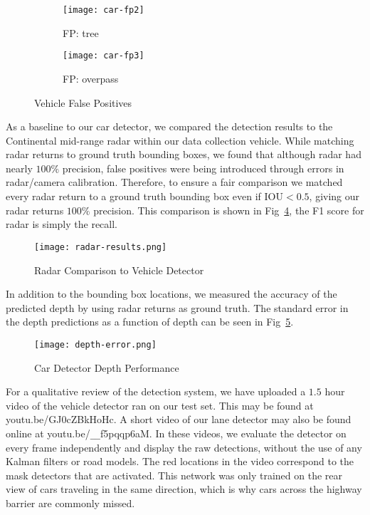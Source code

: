 \documentclass[journal]{IEEEtran}
\begin{document}
\begin{figure}[tb]
        \centering
        \begin{subfigure}[b]{1.7in}\texttt{[image: car-fp2]}
                \caption{FP: tree}
                \label{fig:car-tree}
        \end{subfigure}\begin{subfigure}[b]{1.7in}
                \texttt{[image: car-fp3]}
                \caption{FP: overpass}
                \label{fig:car-overpass}
        \end{subfigure}
        \caption{Vehicle False Positives}\label{fig:car-fp}
\end{figure}

As a baseline to our car detector, we compared the detection results to the Continental mid-range radar within our data collection vehicle. While matching radar returns to ground truth bounding boxes, we found that although radar had nearly $100\%$ precision, false positives were being introduced through errors in radar/camera calibration. Therefore, to ensure a fair comparison we matched every radar return to a ground truth bounding box even if IOU$<0.5$, giving our radar returns $100\%$ precision. This comparison is shown in Fig~\ref{fig:nn-v-radar}, the F1 score for radar is simply the recall.

\begin{figure}[tb]
  \centering
    \texttt{[image: radar-results.png]}
 \caption{Radar Comparison to Vehicle Detector}
 \label{fig:nn-v-radar}
\end{figure}


In addition to the bounding box locations, we measured the accuracy of the predicted depth by using radar returns as ground truth. The standard error in the depth predictions as a function of depth can be seen in Fig~\ref{fig:car-depth-error}.

\begin{figure}[tb]
  \centering
\texttt{[image: depth-error.png]}
 \caption{Car Detector Depth Performance}
 \label{fig:car-depth-error}
\end{figure}


For a qualitative review of the detection system, we have uploaded a $1.5$ hour video of the vehicle detector ran on our test set. This may be found at youtu.be/GJ0cZBkHoHc. A short video of our lane detector may also be found online at youtu.be/\texttt{\_\_}f5pqqp6aM. In these videos, we evaluate the detector on every frame independently and display the raw detections, without the use of any Kalman filters or road models. The red locations in the video correspond to the mask detectors that are activated. This network was only trained on the rear view of cars traveling in the same direction, which is why cars across the highway barrier are commonly missed.
\end{document}
